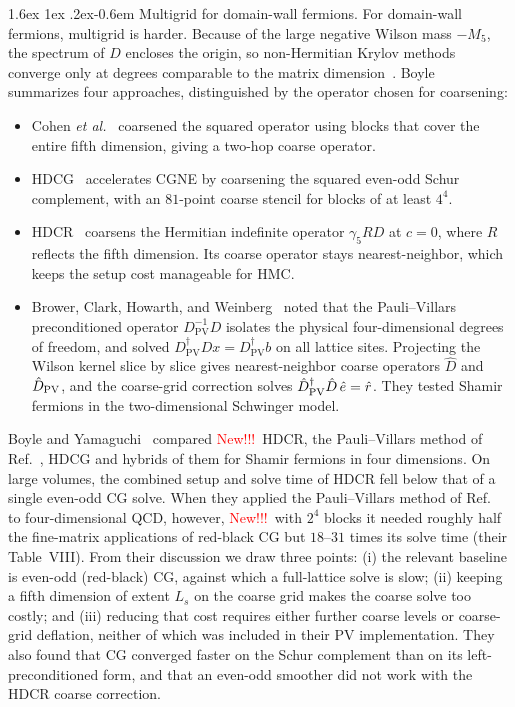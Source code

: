 \documentclass[11pt,a4paper]{article}
\makeatletter
\newif\ifshownew \shownewtrue
\DeclareRobustCommand\New{\ifshownew\textcolor{red}{New!!!}\ \else\ignorespaces\fi}
\renewcommand\paragraph{\@startsection{paragraph}{4}{\z@}%
  {1.6ex \@plus 1ex \@minus .2ex}{-0.6em}%
  {\normalfont\normalsize\itshape}}
\numberwithin{equation}{section}
\newcommand{\dg}{^{\dagger}}
\newcommand{\Dpv}{D_{\mathrm{PV}}}
\newif\ifresults
\makeatother
\begin{document}
\paragraph{Multigrid for domain-wall fermions.}
For domain-wall fermions, multigrid is harder. Because of the large negative Wilson mass $-M_5$,
the spectrum of $D$ encloses the origin, so non-Hermitian Krylov methods converge only at degrees
comparable to the matrix dimension~\cite{NRT,BoyleMRHS}. Boyle~\cite{BoyleMRHS} summarizes four
approaches, distinguished by the operator chosen for coarsening:
\begin{itemize}
\item Cohen \textit{et al.}~\cite{Cohen} coarsened the squared operator using blocks that cover
the entire fifth dimension, giving a two-hop coarse operator.
\item HDCG~\cite{HDCG} accelerates CGNE by coarsening the squared even-odd Schur complement, with
an $81$-point coarse stencil for blocks of at least $4^4$.
\item HDCR~\cite{HDCR} coarsens the Hermitian indefinite operator $\gamma_5RD$ at $c=0$, where $R$
reflects the fifth dimension. Its coarse operator stays nearest-neighbor, which keeps the setup
cost manageable for HMC.
\item Brower, Clark, Howarth, and Weinberg~\cite{BCHW} noted that the Pauli--Villars preconditioned
operator $\Dpv^{-1}D$ isolates the physical four-dimensional degrees of freedom, and solved
$\Dpv\dg Dx=\Dpv\dg b$ on all lattice sites. Projecting the Wilson kernel slice by slice gives
nearest-neighbor coarse operators $\hat D$ and $\hat D_{\rm PV}$, and the coarse-grid correction
solves $\hat D_{\rm PV}\dg\hat D\,\hat e=\hat r$. They tested Shamir fermions in the
two-dimensional Schwinger model.
\end{itemize}
Boyle and Yamaguchi~\cite{BY} compared \New HDCR, the Pauli--Villars method of Ref.~\cite{BCHW}, HDCG and hybrids of them for Shamir fermions in four dimensions. On
large volumes, the combined setup and solve time of HDCR fell below that of a single even-odd CG
solve. When they applied the Pauli--Villars method of Ref.~\cite{BCHW} to four-dimensional QCD,
however, \New with $2^4$ blocks it needed roughly half the fine-matrix applications of red-black CG but $18$--$31$ times
its solve time (their Table~VIII). From their discussion we draw three points: (i) the relevant baseline is even-odd (red-black) CG,
against which a full-lattice solve is slow; (ii) keeping a fifth dimension of extent $L_s$ on the
coarse grid makes the coarse solve too costly; and (iii) reducing that cost requires either further
coarse levels or coarse-grid deflation, neither of which was included in their PV implementation.
They also found that CG converged faster on the Schur complement than on its left-preconditioned
form\ifresults{} (for the M\"obius setups of this work at $\alpha=0.6$ the order is reversed; see
Appendix~\ref{sec:cgform})\fi, and that an even-odd smoother did not work with the HDCR coarse
correction.
\end{document}

